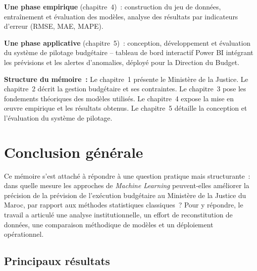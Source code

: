 \documentclass[12pt,a4paper]{article}
\begin{document}
\textbf{Une phase empirique} (chapitre~4)~: construction du jeu de donn\'ees, entra\^inement et \'evaluation des mod\`eles, analyse des r\'esultats par indicateurs d'erreur (RMSE, MAE, MAPE).

\textbf{Une phase applicative} (chapitre~5)~: conception, d\'eveloppement et \'evaluation du syst\`eme de pilotage budg\'etaire -- tableau de bord interactif Power BI int\'egrant les pr\'evisions et les alertes d'anomalies, d\'eploy\'e pour la Direction du Budget.

\medskip

\textbf{Structure du m\'emoire~:} Le chapitre~1 pr\'esente le Minist\`ere de la Justice. Le chapitre~2 d\'ecrit la gestion budg\'etaire et ses contraintes. Le chapitre~3 pose les fondements th\'eoriques des mod\`eles utilis\'es. Le chapitre~4 expose la mise en \oe{}uvre empirique et les r\'esultats obtenus. Le chapitre~5 d\'etaille la conception et l'\'evaluation du syst\`eme de pilotage.

\newpage



\newpage


\newpage


\newpage


\newpage


\newpage

\section*{Conclusion g\'en\'erale}

Ce m\'emoire s'est attach\'e \`a r\'epondre \`a une question pratique mais structurante~:
dans quelle mesure les approches de \textit{Machine Learning} peuvent-elles am\'eliorer
la pr\'ecision de la pr\'evision de l'ex\'ecution budg\'etaire au Minist\`ere de la
Justice du Maroc, par rapport aux m\'ethodes statistiques classiques~? Pour y r\'epondre,
le travail a articul\'e une analyse institutionnelle, un effort de reconstitution de
donn\'ees, une comparaison m\'ethodique de mod\`eles et un d\'eploiement op\'erationnel.

\subsection*{Principaux r\'esultats}
\end{document}
